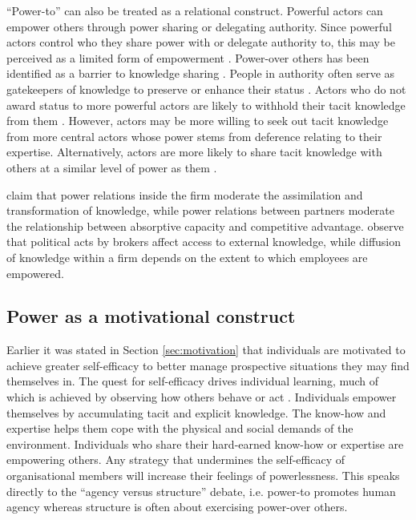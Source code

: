 \enquote{Power-to} can also be treated as a relational construct. Powerful actors can empower others through power sharing or delegating authority. Since powerful actors control who they share power with or delegate authority to, this may be perceived as a limited form of empowerment \citep{conger1988empowerment}. Power-over others has been identified as a barrier to knowledge sharing \citep{riege2005three,suppiah2011organisational}. People in authority often serve as gatekeepers of knowledge to preserve or enhance their status \citep{cross2001beyond}. Actors who do not award status to more powerful actors are likely to withhold their tacit knowledge from them \citep{cabrera2006determinants}. However, actors may be more willing to seek out tacit knowledge from more central actors whose power stems from deference relating to their expertise. Alternatively, actors are more likely to share tacit knowledge with others at a similar level of power as them \citep{cabrera2006determinants}. \medskip

\citet{todorova2007absorptive} claim that power relations inside the firm moderate the assimilation and transformation of knowledge, while power relations between partners moderate the relationship between absorptive capacity and competitive advantage. \citet{easterby2008absorptive} observe that political acts by brokers affect access to external knowledge, while diffusion of knowledge within a firm depends on the extent to which employees are empowered. 

\subsection{Power as a motivational construct}

Earlier it was stated in Section \ref{sec:motivation} that individuals are motivated to achieve greater self-efficacy to better manage prospective situations they may find themselves in. The quest for self-efficacy drives individual learning, much of which is achieved by observing how others behave or act \citep{bandura1994self}. Individuals empower themselves by accumulating tacit and explicit knowledge. The know-how and expertise helps them cope with the physical and social demands of the environment. Individuals who share their hard-earned know-how or expertise are empowering others. Any strategy that undermines the self-efficacy of organisational members will increase their feelings of powerlessness. This speaks directly to the \enquote{agency versus structure} debate, i.e. power-to promotes human agency whereas structure is often about exercising power-over others.

